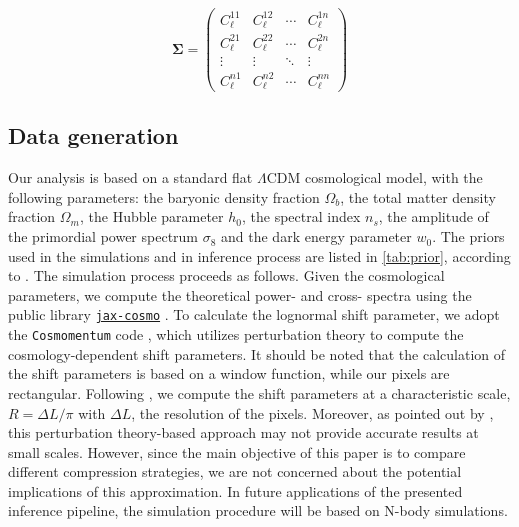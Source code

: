 \documentclass{aa}
\begin{document}
\begin{equation}
    \bm{\Sigma}= 
    \begin{pmatrix}
    C_{\ell}^{11} & C_{\ell}^{12} & \cdots & C_{\ell}^{1n} \\
    C_{\ell}^{21} & C_{\ell}^{22} & \cdots & C_{\ell}^{2n} \\
    \vdots  & \vdots  & \ddots & \vdots  \\
    C_{\ell}^{n1} & C_{\ell}^{n2} & \cdots & C_{\ell}^{nn} 
    \end{pmatrix}
\end{equation}
\subsection{Data generation}
Our analysis is based on a standard flat $\Lambda$CDM cosmological model, with the following parameters: the baryonic density fraction $\Omega_b$, the total matter density fraction $\Omega_m$, the Hubble parameter $h_0$, the spectral index $n_s$, the amplitude of the primordial power spectrum $\sigma_8$ and the dark energy parameter $w_0$. The priors used in the simulations and in inference process are listed in \autoref{tab:prior}, according to \citet{zhang2022transitioning}.
The simulation process proceeds as follows. Given the cosmological parameters, we compute the theoretical power- and cross- spectra using the public library \href{https://github.com/DifferentiableUniverseInitiative/jax_cosmo}{\texttt{jax-cosmo}} \citep{Campagne_2023}. To calculate the 
lognormal shift parameter, we adopt the \texttt{Cosmomentum} code \citep{friedrich2018density, friedrich2020primordial}, which utilizes perturbation theory to compute the cosmology-dependent shift parameters. It should be noted that the calculation of the shift parameters is based on a window function, while our pixels are rectangular. Following \citet{boruah2022map}, we compute the shift parameters at a characteristic scale, $R=\Delta L/\pi$  with $\Delta L$, the resolution of the pixels.  Moreover, as pointed out by \citet{boruah2022map}, this perturbation theory-based approach may not provide accurate results at small scales. However, since the main objective of this paper is to compare different compression strategies, we are not concerned about the potential implications of this approximation. In future applications of the presented inference pipeline, the simulation procedure will be based on N-body simulations.
\end{document}
